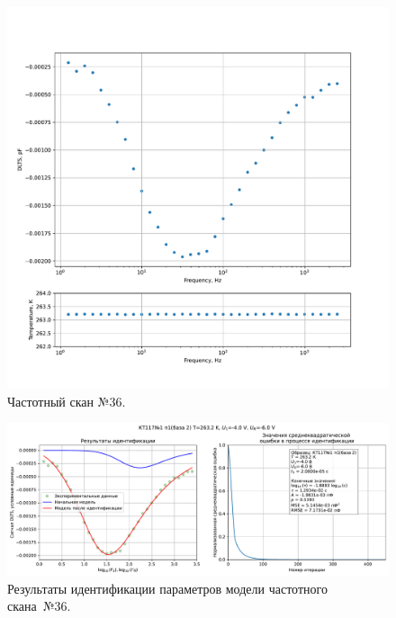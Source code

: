 \begin{figure}[!ht]
    \centering
    \includegraphics[width=1\textwidth]{../plots/КТ117№1_п1(база 2)_2500Гц-1Гц_1пФ_-10С_-4В-6В_50мВ_20мкс_шаг_0,1.pdf}
    \caption{Частотный скан №36.}
    \label{pic:frequency_scan_36}
\end{figure}

\begin{figure}[!ht]
    \centering
    \includegraphics[width=1\textwidth]{../plots/КТ117№1_п1(база 2)_2500Гц-1Гц_1пФ_-10С_-4В-6В_50мВ_20мкс_шаг_0,1_model.pdf}
    \caption{Результаты идентификации параметров модели частотного скана~№36.}
    \label{pic:frequency_scan_model36}
\end{figure}

\pagebreak



